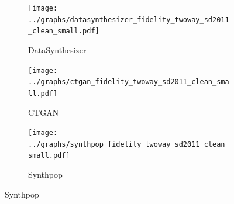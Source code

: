 



\begin{figure}[ht]
  \caption{Compare two-way correlation (sPMSE) from SD2011(c)}
  \label{fig:compare_fidelity_two_way}
  \centering

  \begin{subfigure}{.75\textwidth}
    \texttt{[image: ../graphs/datasynthesizer\_fidelity\_twoway\_sd2011\_clean\_small.pdf]}
    \caption{DataSynthesizer}
    \label{subfig:compare_fidelity_two_way_ds}
  \end{subfigure}

    \begin{subfigure}{.75\textwidth}
    \texttt{[image: ../graphs/ctgan\_fidelity\_twoway\_sd2011\_clean\_small.pdf]}
    \caption{CTGAN}
    \label{subfig:compare_fidelity_two_way_ctgan}
  \end{subfigure}

  \begin{subfigure}{.75\textwidth}
    \texttt{[image: ../graphs/synthpop\_fidelity\_twoway\_sd2011\_clean\_small.pdf]}
    \caption{Synthpop}
    \label{subfig:compare_fidelity_two_way_sp}
  \end{subfigure}
\end{figure}

